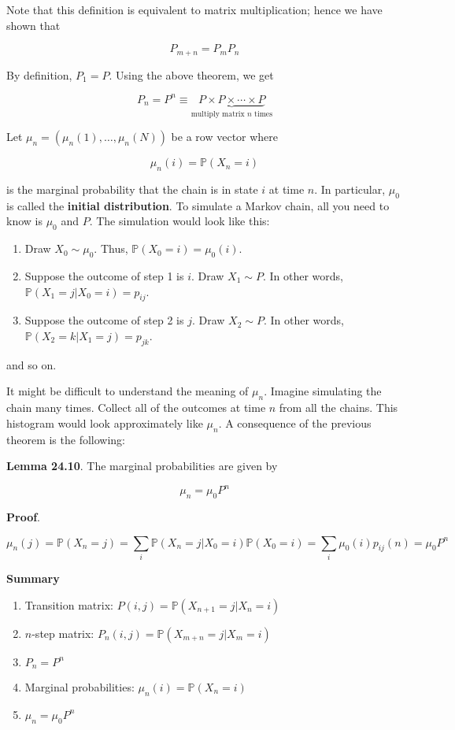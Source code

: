 Note that this definition is equivalent to matrix multiplication; hence
we have shown that

\[ P_{m + n} = P_m P_n \]

By definition, \(P_1 = P\). Using the above theorem, we get

\[ P_n = P^n \equiv \underbrace{P \times P \times \cdots \times P}_{\text{multiply matrix } n \text{ times}} \]

Let \(\mu_n = (\mu_n(1), \dots, \mu_n(N))\) be a row vector where

\[ \mu_n(i) = \mathbb{P}(X_n = i) \]

is the marginal probability that the chain is in state \(i\) at time
\(n\). In particular, \(\mu_0\) is called the \textbf{initial
distribution}. To simulate a Markov chain, all you need to know is
\(\mu_0\) and \(P\). The simulation would look like this:

\begin{enumerate}[tightlist,label={\arabic*.}]
\item
  Draw \(X_0 \sim \mu_0\). Thus, \(\mathbb{P}(X_0 = i) = \mu_0(i)\).
\item
  Suppose the outcome of step 1 is \(i\). Draw \(X_1 \sim P\). In other
  words, \(\mathbb{P}(X_1 = j | X_0 = i) = p_{ij}\).
\item
  Suppose the outcome of step 2 is \(j\). Draw \(X_2 \sim P\). In other
  words, \(\mathbb{P}(X_2 = k | X_1 = j) = p_{jk}\).
\end{enumerate}

and so on.

It might be difficult to understand the meaning of \(\mu_n\). Imagine
simulating the chain many times. Collect all of the outcomes at time
\(n\) from all the chains. This histogram would look approximately like
\(\mu_n\). A consequence of the previous theorem is the following:

\textbf{Lemma 24.10}. The marginal probabilities are given by

\[ \mu_n = \mu_0 P^n \]

\textbf{Proof}.

\[ \mu_n(j) = \mathbb{P}(X_n = j) = \sum_i \mathbb{P}(X_n = j | X_0 = i) \mathbb{P}(X_0 = i) = \sum_i \mu_0(i) p_{ij}(n) = \mu_0 P^n \]

\textbf{Summary}

\begin{enumerate}[tightlist,label={\arabic*.}]
\item
  Transition matrix: \(P(i, j) = \mathbb{P}(X_{n+1} = j | X_n = i)\)
\item
  \(n\)-step matrix: \(P_n(i, j) = \mathbb{P}(X_{m+n} = j | X_m = i)\)
\item
  \(P_n = P^n\)
\item
  Marginal probabilities: \(\mu_n(i) = \mathbb{P}(X_n = i)\)
\item
  \(\mu_n = \mu_0 P^n\)
\end{enumerate}

